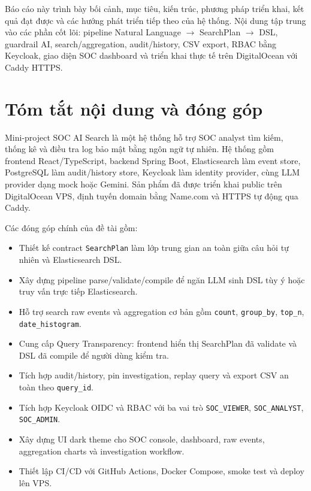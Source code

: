 \documentclass[12pt,a4paper]{report}
\newcommand{\ProjectTitle}{SOC AI Search}
\begin{document}
Báo cáo này trình bày bối cảnh, mục tiêu, kiến trúc, phương pháp triển khai, kết quả đạt được và các hướng phát triển tiếp theo của hệ thống. Nội dung tập trung vào các phần cốt lõi: pipeline Natural Language $\rightarrow$ SearchPlan $\rightarrow$ DSL, guardrail AI, search/aggregation, audit/history, CSV export, RBAC bằng Keycloak, giao diện SOC dashboard và triển khai thực tế trên DigitalOcean với Caddy HTTPS.

\chapter*{Tóm tắt nội dung và đóng góp}

Mini-project \ProjectTitle{} là một hệ thống hỗ trợ SOC analyst tìm kiếm, thống kê và điều tra log bảo mật bằng ngôn ngữ tự nhiên. Hệ thống gồm frontend React/TypeScript, backend Spring Boot, Elasticsearch làm event store, PostgreSQL làm audit/history store, Keycloak làm identity provider, cùng LLM provider dạng mock hoặc Gemini. Sản phẩm đã được triển khai public trên DigitalOcean VPS, định tuyến domain bằng Name.com và HTTPS tự động qua Caddy.

Các đóng góp chính của đề tài gồm:

\begin{itemize}
    \item Thiết kế contract \texttt{SearchPlan} làm lớp trung gian an toàn giữa câu hỏi tự nhiên và Elasticsearch DSL.
    \item Xây dựng pipeline parse/validate/compile để ngăn LLM sinh DSL tùy ý hoặc truy vấn trực tiếp Elasticsearch.
    \item Hỗ trợ search raw events và aggregation cơ bản gồm \texttt{count}, \texttt{group\_by}, \texttt{top\_n}, \texttt{date\_histogram}.
    \item Cung cấp Query Transparency: frontend hiển thị SearchPlan đã validate và DSL đã compile để người dùng kiểm tra.
    \item Tích hợp audit/history, pin investigation, replay query và export CSV an toàn theo \texttt{query\_id}.
    \item Tích hợp Keycloak OIDC và RBAC với ba vai trò \texttt{SOC\_VIEWER}, \texttt{SOC\_ANALYST}, \texttt{SOC\_ADMIN}.
    \item Xây dựng UI dark theme cho SOC console, dashboard, raw events, aggregation charts và investigation workflow.
    \item Thiết lập CI/CD với GitHub Actions, Docker Compose, smoke test và deploy lên VPS.
\end{itemize}
\end{document}
